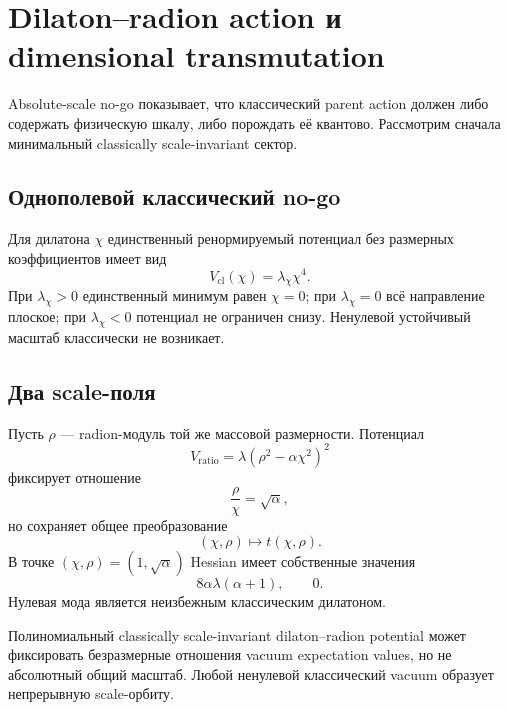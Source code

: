 \chapter{Dilaton--radion action и dimensional transmutation}

Absolute-scale no-go показывает, что классический parent action должен либо
содержать физическую шкалу, либо порождать её квантово. Рассмотрим сначала
минимальный classically scale-invariant сектор.

\section{Однополевой классический no-go}

Для дилатона \(\chi\) единственный ренормируемый потенциал без размерных
коэффициентов имеет вид
\begin{equation}
 V_{\mathrm{cl}}(\chi)=\lambda_\chi\chi^4.
\end{equation}
При \(\lambda_\chi>0\) единственный минимум равен \(\chi=0\); при
\(\lambda_\chi=0\) всё направление плоское; при
\(\lambda_\chi<0\) потенциал не ограничен снизу. Ненулевой устойчивый
масштаб классически не возникает.

\section{Два scale-поля}

Пусть \(\rho\) --- radion-модуль той же массовой размерности. Потенциал
\begin{equation}
 V_{\mathrm{ratio}}
 =\lambda\left(\rho^2-\alpha\chi^2\right)^2
\end{equation}
фиксирует отношение
\begin{equation}
 \frac{\rho}{\chi}=\sqrt\alpha,
\end{equation}
но сохраняет общее преобразование
\begin{equation}
 (\chi,\rho)\longmapsto t(\chi,\rho).
\end{equation}
В точке \((\chi,\rho)=(1,\sqrt\alpha)\) Hessian имеет собственные значения
\begin{equation}
 8\alpha\lambda(\alpha+1),
 \qquad 0.
\end{equation}
Нулевая мода является неизбежным классическим дилатоном.

\begin{theorem}
Полиномиальный classically scale-invariant dilaton--radion potential может
фиксировать безразмерные отношения vacuum expectation values, но не
абсолютный общий масштаб. Любой ненулевой классический vacuum образует
непрерывную scale-орбиту.
\end{theorem}

